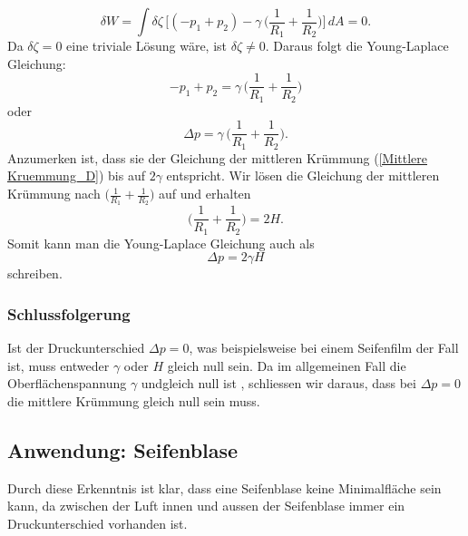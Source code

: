 \begin{refsection}
\begin{equation}
\delta W = \int \delta\zeta \, \bigg[ (-p_1+p_2)-\gamma \, \bigg( \frac{1}{R_1}+\frac{1}{R_2} \bigg) \bigg]\,dA =0.
\end{equation}
Da $\delta\zeta=0$ eine triviale Lösung wäre, ist $\delta\zeta \neq 0$. Daraus folgt die Young-Laplace Gleichung:
\begin{equation}
-p_1+p_2 = \gamma \, \bigg( \frac{1}{R_1}+\frac{1}{R_2} \bigg)
\end{equation}
oder
\begin{equation}\label{Young-Laplace-Equation}
\Delta p = \gamma \, \bigg( \frac{1}{R_1}+\frac{1}{R_2} \bigg).
\end{equation}
Anzumerken ist, dass sie der Gleichung der mittleren Krümmung (\ref{Mittlere Kruemmung_D}) bis auf $2\gamma$ entspricht. Wir lösen die Gleichung der mittleren Krümmung nach $\bigg( \frac{1}{R_1}+\frac{1}{R_2} \bigg)$ auf und erhalten
\begin{equation}
\bigg( \frac{1}{R_1}+\frac{1}{R_2} \bigg)=2H.
\end{equation}
Somit kann man die Young-Laplace Gleichung auch als
\begin{equation}\label{YL-Result2}
\Delta p=2\gamma H
\end{equation}
schreiben.

\subsubsection{Schlussfolgerung}\label{YL-conclusion}
Ist der Druckunterschied $\Delta p =0$, was beispielsweise bei einem Seifenfilm der Fall ist, muss entweder $\gamma$ oder $H$ gleich null sein. Da im allgemeinen Fall  die Oberflächenspannung $\gamma$ undgleich null ist \cite{minimal:Eotvos},  schliessen wir daraus, dass bei  $\Delta p =0$ die mittlere Krümmung gleich null sein muss.

\subsection{Anwendung: Seifenblase}
Durch diese Erkenntnis ist klar, dass eine Seifenblase keine Minimalfläche sein kann, da zwischen der Luft innen und aussen der Seifenblase immer ein Druckunterschied vorhanden ist.


\end{refsection}
